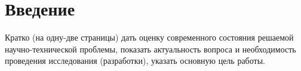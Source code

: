 \chapter*{Введение}

Кратко (на одну-две страницы) дать оценку современного состояния
решаемой научно-технической проблемы, показать актуальность вопроса и
необходимость проведения исследования (разработки), указать основную
цель работы.